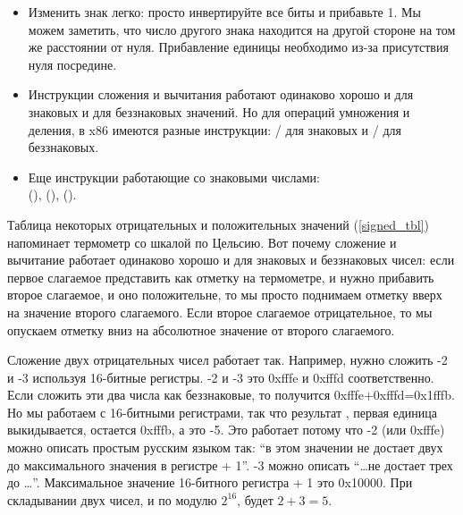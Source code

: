 \begin{itemize}
	.

\label{sec:signednumbers:negation}
\item Изменить знак легко: просто инвертируйте все биты и прибавьте 1.
Мы можем заметить, что число другого знака находится на другой стороне на том же расстоянии от нуля.
Прибавление единицы необходимо из-за присутствия нуля посредине.

\item Инструкции сложения и вычитания работают одинаково хорошо и для знаковых и для беззнаковых значений.
	Но для операций умножения и деления, в x86 имеются разные инструкции:
	/ для знаковых и / для беззнаковых.

\item Еще инструкции работающие со знаковыми числами:\\
	 (),  (),  ().
\end{itemize}

Таблица некоторых отрицательных и положительных значений (\ref{signed_tbl}) напоминает термометр со шкалой по Цельсию.
Вот почему сложение и вычитание работает одинаково хорошо и для знаковых и беззнаковых чисел:
если первое слагаемое представить как отметку на термометре, и нужно прибавить второе слагаемое,
и оно положительне, то мы просто поднимаем отметку вверх на значение второго слагаемого.
Если второе слагаемое отрицательное, то мы опускаем отметку вниз на абсолютное значение от второго слагаемого.

Сложение двух отрицательных чисел работает так.
Например, нужно сложить -2 и -3 используя 16-битные регистры.
-2 и -3 это 0xfffe и 0xfffd соответственно.
Если сложить эти два числа как беззнаковые, то получится 0xfffe+0xfffd=0x1fffb.
Но мы работаем с 16-битными регистрами, так что результат , первая единица выкидывается,
остается 0xfffb, а это -5.
Это работает потому что -2 (или 0xfffe) можно описать простым русским языком так:
``в этом значении не достает двух до максимального значения в регистре + 1''.
-3 можно описать ``\dots не достает трех до \dots''.
Максимальное значение 16-битного регистра + 1 это 0x10000.
При складывании двух чисел, и  по модулю $2^{16}$,  будет $2+3=5$.




